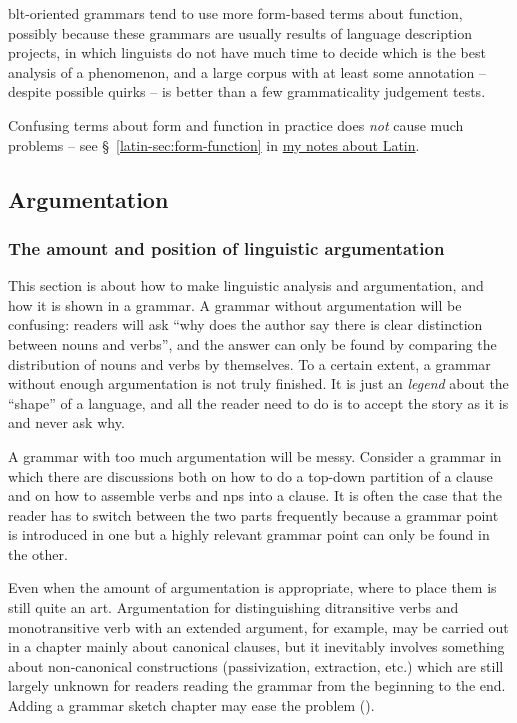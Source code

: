 \documentclass[UTF8, a4paper, oneside, scheme=plain]{ctexart}
\newcommand*{\citesec}[1]{\S~{#1}}
\newcommand{\latin}{\href{../Latin/latin-notes.pdf}{my notes about Latin}}
\begin{document}
\ac{blt}-oriented grammars tend to use more form-based terms about function,
possibly because these grammars are usually results of language description projects,
in which linguists do not have much time to decide which is the best analysis of a phenomenon,
and a large corpus with at least some annotation 
-- despite possible quirks -- 
is better than a few grammaticality judgement tests.

Confusing terms about form and function in practice does \emph{not} cause much problems
-- see \citesec{\ref{latin-sec:form-function}} in \latin.

\subsection{Argumentation}\label{sec:argumentation}

\subsubsection{The amount and position of linguistic argumentation}\label{sec:argumentation-amount}

This section is about how to make linguistic analysis and argumentation,
and how it is shown in a grammar.
A grammar without argumentation will be confusing:
readers will ask ``why does the author say there is clear distinction between nouns and verbs'',
and the answer can only be found by comparing the distribution of nouns and verbs by themselves.
To a certain extent, a grammar without enough argumentation is not truly finished.
It is just an \emph{legend} about the ``shape'' of a language,
and all the reader need to do is to accept the story as it is and never ask why.

A grammar with too much argumentation will be messy.
Consider a grammar in which there are discussions both 
on how to do a top-down partition of a clause 
and on how to assemble verbs and \ac{np}s into a clause. %
It is often the case that the reader has to switch between the two parts frequently 
because a grammar point is introduced in one 
but a highly relevant grammar point can only be found in the other.

Even when the amount of argumentation is appropriate,
where to place them is still quite an art.
Argumentation for distinguishing ditransitive verbs and monotransitive verb with an extended argument,
for example, may be carried out in a chapter mainly about canonical clauses,
but it inevitably involves something about non-canonical constructions 
(passivization, extraction, etc.)
which are still largely unknown for readers reading the grammar from the beginning to the end.
Adding a grammar sketch chapter may ease the problem ().
\end{document}
